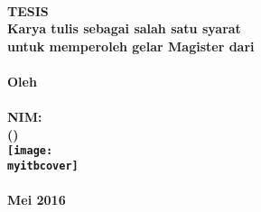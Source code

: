 \thispagestyle{empty}
\begin{center}
\textbf{\large
	\MakeUppercase{\mytitle{}} \\
	\vfill
	TESIS \\
	\bigskip
	{\normalsize
		Karya tulis sebagai salah satu syarat \\
		untuk memperoleh gelar Magister dari \\
		\itb{} \\
	}
	\vfill
	{\normalsize Oleh} \\
	\MakeUppercase{\myname{}} \\
	NIM: \mysid{} \\
	(\mydept{}) \\
	\vfill
	\texttt{[image: \\myitbcover]} \\
	\vfill
	\MakeUppercase{\itb{}} \\
	Mei 2016 \\
}
\end{center}
